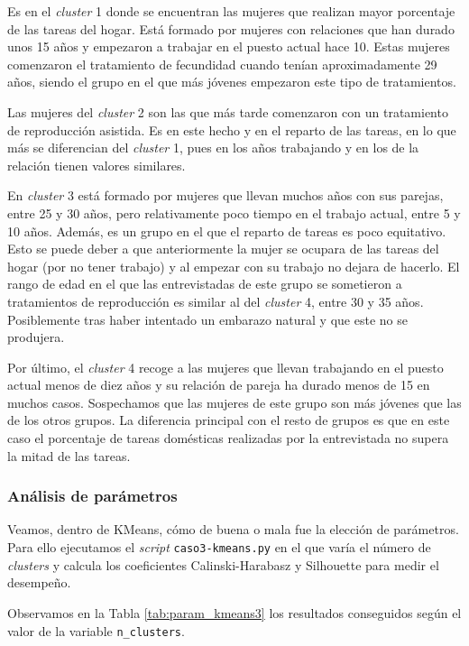 \documentclass[a4paper, 20pt]{article}
\begin{document}
Es en el \textit{cluster} 1 donde se encuentran las mujeres que realizan mayor porcentaje de las tareas del hogar. Está formado por mujeres con relaciones que han durado unos 15 años y empezaron a trabajar en el puesto actual hace 10. Estas mujeres comenzaron el tratamiento de fecundidad cuando tenían aproximadamente 29 años, siendo el grupo en el que más jóvenes empezaron este tipo de tratamientos.

Las mujeres del \textit{cluster} 2 son las que más tarde comenzaron con un tratamiento de reproducción asistida. Es en este hecho y en el reparto de las tareas, en lo que más se diferencian del \textit{cluster} 1, pues en los años trabajando y en los de la relación tienen valores similares.

En \textit{cluster} 3 está formado por mujeres que llevan muchos años con sus parejas, entre 25 y 30 años, pero relativamente poco tiempo en el trabajo actual, entre 5 y 10 años. Además, es un grupo en el que el reparto de tareas es poco equitativo. Esto se puede deber a que anteriormente la mujer se ocupara de las tareas del hogar (por no tener trabajo) y al empezar con su trabajo no dejara de hacerlo. El rango de edad en el que las entrevistadas de este grupo se sometieron a tratamientos de reproducción es similar al del \textit{cluster} 4, entre 30 y 35 años. Posiblemente tras haber intentado un embarazo natural y que este no se produjera.

Por último, el \textit{cluster} 4 recoge a las mujeres que llevan trabajando en el puesto actual menos de diez años y su relación de pareja ha durado menos de 15 en muchos casos. Sospechamos que las mujeres de este grupo son más jóvenes que las de los otros grupos. La diferencia principal con el resto de grupos es que en este caso el porcentaje de tareas domésticas realizadas por la entrevistada no supera la mitad de las tareas.

\subsubsection{Análisis de parámetros}

Veamos, dentro de KMeans, cómo de buena o mala fue la elección de parámetros. Para ello ejecutamos el \textit{script} \texttt{caso3-kmeans.py} en el que varía el número de \textit{clusters} y calcula los coeficientes Calinski-Harabasz y Silhouette para medir el desempeño.

Observamos en la Tabla \ref{tab:param_kmeans3} los resultados conseguidos según el valor de la variable \texttt{n\_clusters}.
\end{document}
